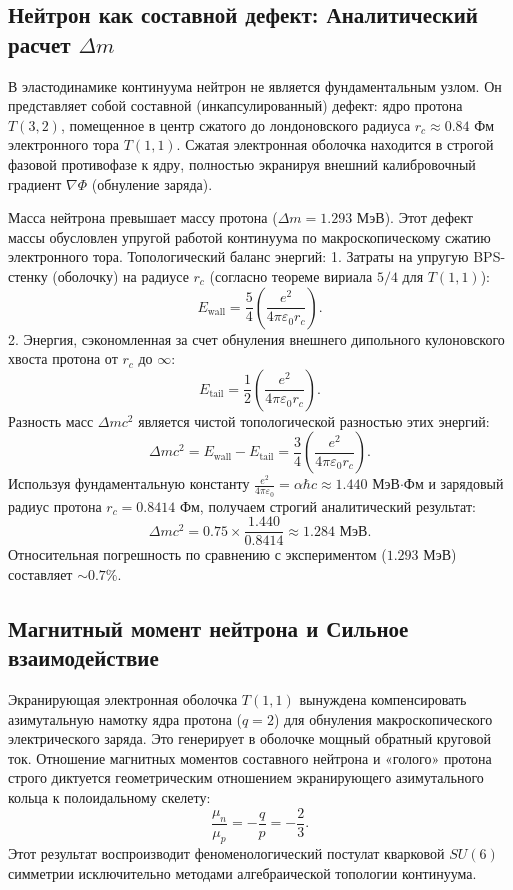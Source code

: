 \documentclass[11pt,a4paper]{article}
\begin{document}
\subsection{Нейтрон как составной дефект: Аналитический расчет $\Delta m$}
В эластодинамике континуума нейтрон не является фундаментальным узлом. Он представляет собой составной (инкапсулированный) дефект: ядро протона $T(3,2)$, помещенное в центр сжатого до лондоновского радиуса $r_c \approx 0.84$ Фм электронного тора $T(1,1)$. Сжатая электронная оболочка находится в строгой фазовой противофазе к ядру, полностью экранируя внешний калибровочный градиент $\nabla \Phi$ (обнуление заряда).

Масса нейтрона превышает массу протона ($\Delta m = 1.293$ МэВ). Этот дефект массы обусловлен упругой работой континуума по макроскопическому сжатию электронного тора. Топологический баланс энергий:
1. Затраты на упругую BPS-стенку (оболочку) на радиусе $r_c$ (согласно теореме вириала $5/4$ для $T(1,1)$):
\begin{equation}
E_{\text{wall}} = \frac{5}{4} \left( \frac{e^2}{4\pi\varepsilon_0 r_c} \right).
\end{equation}
2. Энергия, сэкономленная за счет обнуления внешнего дипольного кулоновского хвоста протона от $r_c$ до $\infty$:
\begin{equation}
E_{\text{tail}} = \frac{1}{2} \left( \frac{e^2}{4\pi\varepsilon_0 r_c} \right).
\end{equation}
Разность масс $\Delta m c^2$ является чистой топологической разностью этих энергий:
\begin{equation}
\Delta m c^2 = E_{\text{wall}} - E_{\text{tail}} = \frac{3}{4} \left( \frac{e^2}{4\pi\varepsilon_0 r_c} \right).
\end{equation}
Используя фундаментальную константу $\frac{e^2}{4\pi\varepsilon_0} = \alpha \hbar c \approx 1.440$ МэВ$\cdot$Фм и зарядовый радиус протона $r_c = 0.8414$ Фм, получаем строгий аналитический результат:
\begin{equation}
\Delta m c^2 = 0.75 \times \frac{1.440}{0.8414} \approx 1.284 \text{ МэВ}.
\end{equation}
Относительная погрешность по сравнению с экспериментом ($1.293$ МэВ) составляет $\sim 0.7\%$.

\subsection{Магнитный момент нейтрона и Сильное взаимодействие}
Экранирующая электронная оболочка $T(1,1)$ вынуждена компенсировать азимутальную намотку ядра протона ($q=2$) для обнуления макроскопического электрического заряда. Это генерирует в оболочке мощный обратный круговой ток. Отношение магнитных моментов составного нейтрона и «голого» протона строго диктуется геометрическим отношением экранирующего азимутального кольца к полоидальному скелету:
\begin{equation}
\frac{\mu_n}{\mu_p} = -\frac{q}{p} = -\frac{2}{3}.
\end{equation}
Этот результат воспроизводит феноменологический постулат кварковой $SU(6)$ симметрии исключительно методами алгебраической топологии континуума.
\end{document}
